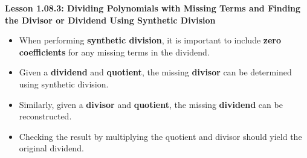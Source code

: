 \begin{center}
\textbf{Lesson 1.08.3: Dividing Polynomials with Missing Terms and Finding the Divisor or Dividend Using Synthetic Division}
\end{center}

\vspace*{-1.5ex}

\begin{itemize}
    \item When performing \textbf{synthetic division}, it is important to include \textbf{zero coefficients} for any missing terms in the dividend.
    \item Given a \textbf{dividend} and \textbf{quotient}, the missing \textbf{divisor} can be determined using synthetic division.
    \item Similarly, given a \textbf{divisor} and \textbf{quotient}, the missing \textbf{dividend} can be reconstructed.
    \item Checking the result by multiplying the quotient and divisor should yield the original dividend.
\end{itemize}
